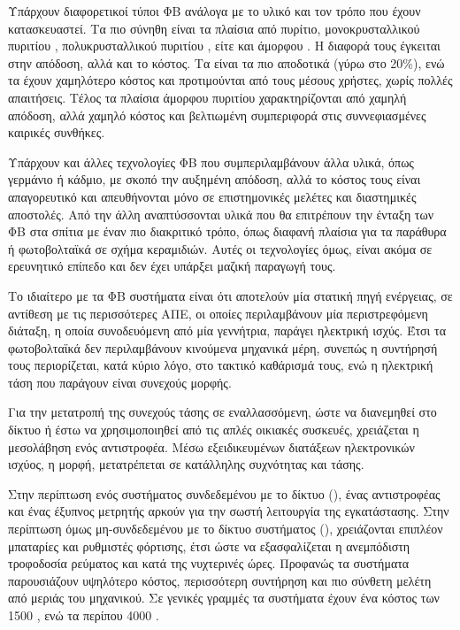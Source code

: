 \documentclass[12pt]{report}
\begin{document}
Υπάρχουν διαφορετικοί τύποι ΦΒ ανάλογα με το υλικό και τον τρόπο που έχουν κατασκευαστεί. Τα πιο σύνηθη είναι τα πλαίσια από πυρίτιο, μονοκρυσταλλικού πυριτίου {}, πολυκρυσταλλικού πυριτίου {}, 
είτε και άμορφου {}. Η διαφορά τους έγκειται στην απόδοση, αλλά και το κόστος. Τα {} είναι τα πιο αποδοτικά (γύρω στο 20\%), ενώ τα {} έχουν χαμηλότερο κόστος και προτιμούνται
από τους μέσους χρήστες, χωρίς πολλές απαιτήσεις. Τέλος τα πλαίσια άμορφου πυριτίου χαρακτηρίζονται από χαμηλή απόδοση, αλλά χαμηλό κόστος και βελτιωμένη συμπεριφορά στις συννεφιασμένες καιρικές συνθήκες. 

Υπάρχουν και άλλες τεχνολογίες ΦΒ που συμπεριλαμβάνουν άλλα υλικά, όπως γερμάνιο ή κάδμιο, με σκοπό την αυξημένη απόδοση, αλλά το κόστος τους είναι απαγορευτικό και απευθήνονται μόνο σε επιστημονικές μελέτες και διαστημικές
αποστολές. Από την άλλη αναπτύσσονται υλικά που θα επιτρέπουν την ένταξη των ΦΒ στα σπίτια με έναν πιο διακριτικό τρόπο, όπως διαφανή πλαίσια για τα παράθυρα ή φωτοβολταϊκά σε σχήμα κεραμιδιών. Αυτές οι τεχνολογίες όμως, είναι
ακόμα σε ερευνητικό επίπεδο και δεν έχει υπάρξει μαζική παραγωγή τους.

Το ιδιαίτερο με τα ΦΒ συστήματα είναι ότι αποτελούν μία στατική πηγή ενέργειας, σε αντίθεση με τις περισσότερες ΑΠΕ, οι οποίες περιλαμβάνουν μία περιστρεφόμενη διάταξη, η οποία συνοδευόμενη από μία γεννήτρια, παράγει ηλεκτρική
ισχύς. Έτσι τα φωτοβολταϊκά δεν περιλαμβάνουν κινούμενα μηχανικά μέρη, συνεπώς η συντήρησή τους περιορίζεται, κατά κύριο λόγο, στο τακτικό καθάρισμά τους, ενώ η ηλεκτρική τάση που παράγουν είναι συνεχούς μορφής.

Για την μετατροπή της συνεχούς τάσης σε εναλλασσόμενη, ώστε να διανεμηθεί στο δίκτυο ή έστω να χρησιμοποιηθεί από τις απλές οικιακές συσκευές, χρειάζεται η μεσολάβηση ενός αντιστροφέα. Μέσω εξειδικευμένων διατάξεων ηλεκτρονικών
ισχύος, η {} μορφή, μετατρέπεται σε {} κατάλληλης συχνότητας και τάσης. 

Στην περίπτωση ενός συστήματος συνδεδεμένου με το δίκτυο ({}), ένας αντιστροφέας και ένας έξυπνος μετρητής αρκούν για την σωστή λειτουργία της εγκατάστασης. Στην περίπτωση όμως μη-συνδεδεμένου με το δίκτυο
συστήματος ({}), χρειάζονται επιπλέον μπαταρίες και ρυθμιστές φόρτισης, έτσι ώστε να εξασφαλίζεται η ανεμπόδιστη τροφοδοσία ρεύματος και κατά της νυχτερινές ώρες. Προφανώς τα {}
συστήματα παρουσιάζουν υψηλότερο κόστος, περισσότερη συντήρηση και πιο σύνθετη μελέτη από μεριάς του μηχανικού. Σε γενικές γραμμές τα {} συστήματα έχουν ένα κόστος των 1500 {}, ενώ τα 
{} περίπου 4000 {}.
\end{document}
